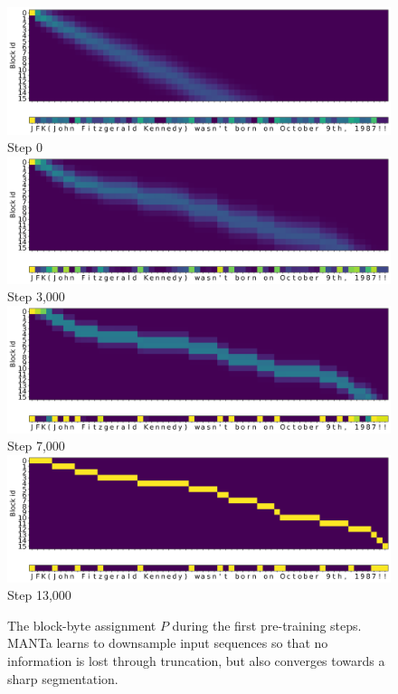 \begin{figure}[ht!]
    \centering\small
    \includegraphics[width=0.6\columnwidth]{sources/part_2/manta/images/mapping_example_0.png}\\
    Step 0\\[2mm]
    \includegraphics[width=0.6\columnwidth]{sources/part_2/manta/images/mapping_example_3000.png}\\
    Step 3,000\\[2mm]
    \includegraphics[width=0.6\columnwidth]{sources/part_2/manta/images/mapping_example_7000.png}\\
    Step 7,000\\[2mm]
    \includegraphics[width=0.6\columnwidth]{sources/part_2/manta/images/mapping_example_13000.png}\\
    Step 13,000\\
    \caption{The block-byte assignment $P$ during the first pre-training steps. MANTa learns to downsample input sequences so that no information is lost through truncation, but also converges towards a sharp segmentation.}
    \label{fig:mapping_example}
\end{figure}



